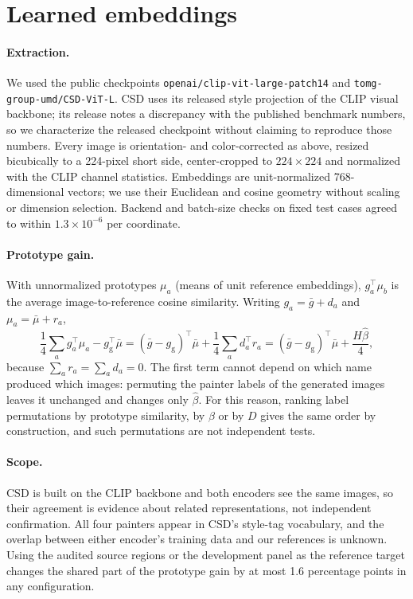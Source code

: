\FloatBarrier
\section{Learned embeddings}\label{app:learned}

\paragraph{Extraction.} We used the public checkpoints
\texttt{openai/clip-vit-large-patch14} and \texttt{tomg-group-umd/CSD-ViT-L}. CSD uses
its released style projection of the CLIP visual backbone; its release notes a
discrepancy with the published benchmark numbers, so we characterize the released
checkpoint without claiming to reproduce those numbers. Every image is
orientation- and color-corrected as above, resized bicubically to a 224-pixel short
side, center-cropped to $224\times224$ and normalized with the CLIP channel
statistics. Embeddings are unit-normalized 768-dimensional vectors; we use their
Euclidean and cosine geometry without scaling or dimension selection. Backend and
batch-size checks on fixed test cases agreed to within $1.3\times10^{-6}$ per
coordinate.

\paragraph{Prototype gain.} With unnormalized prototypes $\mu_a$ (means of unit
reference embeddings), $g_a^\top\mu_b$ is the average image-to-reference cosine
similarity. Writing $g_a=\bar g+d_a$ and $\mu_a=\bar\mu+r_a$,
\begin{equation}
\frac14\sum_a g_a^\top\mu_a-g_{\mathrm g}^\top\bar\mu
=(\bar g-g_{\mathrm g})^\top\bar\mu+\frac14\sum_a d_a^\top r_a
=(\bar g-g_{\mathrm g})^\top\bar\mu+\frac{H\widehat\beta}{4},
\end{equation}
because $\sum_a r_a=\sum_a d_a=0$. The first term cannot depend on which name produced
which images: permuting the painter labels of the generated images leaves it
unchanged and changes only $\widehat\beta$. For this reason, ranking label
permutations by prototype similarity, by $\beta$ or by $D$ gives the same order by
construction, and such permutations are not independent tests.

\paragraph{Scope.} CSD is built on the CLIP backbone and both encoders see the same
images, so their agreement is evidence about related representations, not independent
confirmation. All four painters appear in CSD's style-tag vocabulary, and the overlap
between either encoder's training data and our references is unknown. Using the
audited source regions or the development panel as the reference target changes the
shared part of the prototype gain by at most 1.6 percentage points in any
configuration.

